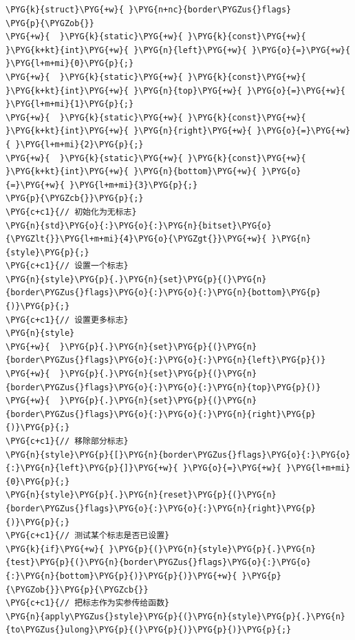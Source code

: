 \begin{codeblockbg}
\begin{Verbatim}[commandchars=\\\{\},breaklines=true,breakanywhere=true,fontsize=\codefont,xleftmargin=17bp]
\PYG{k}{struct}\PYG{+w}{ }\PYG{n+nc}{border\PYGZus{}flags}
\PYG{p}{\PYGZob{}}
\PYG{+w}{  }\PYG{k}{static}\PYG{+w}{ }\PYG{k}{const}\PYG{+w}{ }\PYG{k+kt}{int}\PYG{+w}{ }\PYG{n}{left}\PYG{+w}{ }\PYG{o}{=}\PYG{+w}{ }\PYG{l+m+mi}{0}\PYG{p}{;}
\PYG{+w}{  }\PYG{k}{static}\PYG{+w}{ }\PYG{k}{const}\PYG{+w}{ }\PYG{k+kt}{int}\PYG{+w}{ }\PYG{n}{top}\PYG{+w}{ }\PYG{o}{=}\PYG{+w}{ }\PYG{l+m+mi}{1}\PYG{p}{;}
\PYG{+w}{  }\PYG{k}{static}\PYG{+w}{ }\PYG{k}{const}\PYG{+w}{ }\PYG{k+kt}{int}\PYG{+w}{ }\PYG{n}{right}\PYG{+w}{ }\PYG{o}{=}\PYG{+w}{ }\PYG{l+m+mi}{2}\PYG{p}{;}
\PYG{+w}{  }\PYG{k}{static}\PYG{+w}{ }\PYG{k}{const}\PYG{+w}{ }\PYG{k+kt}{int}\PYG{+w}{ }\PYG{n}{bottom}\PYG{+w}{ }\PYG{o}{=}\PYG{+w}{ }\PYG{l+m+mi}{3}\PYG{p}{;}
\PYG{p}{\PYGZcb{}}\PYG{p}{;}
\PYG{c+c1}{// 初始化为无标志}
\PYG{n}{std}\PYG{o}{:}\PYG{o}{:}\PYG{n}{bitset}\PYG{o}{\PYGZlt{}}\PYG{l+m+mi}{4}\PYG{o}{\PYGZgt{}}\PYG{+w}{ }\PYG{n}{style}\PYG{p}{;}
\PYG{c+c1}{// 设置一个标志}
\PYG{n}{style}\PYG{p}{.}\PYG{n}{set}\PYG{p}{(}\PYG{n}{border\PYGZus{}flags}\PYG{o}{:}\PYG{o}{:}\PYG{n}{bottom}\PYG{p}{)}\PYG{p}{;}
\PYG{c+c1}{// 设置更多标志}
\PYG{n}{style}
\PYG{+w}{  }\PYG{p}{.}\PYG{n}{set}\PYG{p}{(}\PYG{n}{border\PYGZus{}flags}\PYG{o}{:}\PYG{o}{:}\PYG{n}{left}\PYG{p}{)}
\PYG{+w}{  }\PYG{p}{.}\PYG{n}{set}\PYG{p}{(}\PYG{n}{border\PYGZus{}flags}\PYG{o}{:}\PYG{o}{:}\PYG{n}{top}\PYG{p}{)}
\PYG{+w}{  }\PYG{p}{.}\PYG{n}{set}\PYG{p}{(}\PYG{n}{border\PYGZus{}flags}\PYG{o}{:}\PYG{o}{:}\PYG{n}{right}\PYG{p}{)}\PYG{p}{;}
\PYG{c+c1}{// 移除部分标志}
\PYG{n}{style}\PYG{p}{[}\PYG{n}{border\PYGZus{}flags}\PYG{o}{:}\PYG{o}{:}\PYG{n}{left}\PYG{p}{]}\PYG{+w}{ }\PYG{o}{=}\PYG{+w}{ }\PYG{l+m+mi}{0}\PYG{p}{;}
\PYG{n}{style}\PYG{p}{.}\PYG{n}{reset}\PYG{p}{(}\PYG{n}{border\PYGZus{}flags}\PYG{o}{:}\PYG{o}{:}\PYG{n}{right}\PYG{p}{)}\PYG{p}{;}
\PYG{c+c1}{// 测试某个标志是否已设置}
\PYG{k}{if}\PYG{+w}{ }\PYG{p}{(}\PYG{n}{style}\PYG{p}{.}\PYG{n}{test}\PYG{p}{(}\PYG{n}{border\PYGZus{}flags}\PYG{o}{:}\PYG{o}{:}\PYG{n}{bottom}\PYG{p}{)}\PYG{p}{)}\PYG{+w}{ }\PYG{p}{\PYGZob{}}\PYG{p}{\PYGZcb{}}
\PYG{c+c1}{// 把标志作为实参传给函数}
\PYG{n}{apply\PYGZus{}style}\PYG{p}{(}\PYG{n}{style}\PYG{p}{.}\PYG{n}{to\PYGZus{}ulong}\PYG{p}{(}\PYG{p}{)}\PYG{p}{)}\PYG{p}{;}
\end{Verbatim}
\end{codeblockbg}


